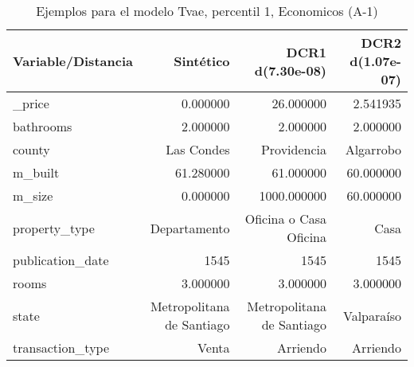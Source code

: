 \begin{table}[H]
\centering
\fontsize{10}{14}\selectfont
\caption{Ejemplos para el modelo Tvae, percentil 1, Economicos (A-1)}
\label{table-example-economicos-a-1-tvae-1p}
\begin{tabular}{|l|r|r|r|}
\hline
\rowcolor[gray]{0.8}
Variable/Distancia & Sintético & DCR1 d(7.30e-08) & DCR2 d(1.07e-07) \\
\hline \_price & \cellcolor[rgb]{0.9, 0.54, 0.52} 0.000000 & 26.000000 & 2.541935 \\
\hline bathrooms & \cellcolor[rgb]{0.9, 0.54, 0.52} 2.000000 & \cellcolor[rgb]{0.9, 0.54, 0.52} 2.000000 & \cellcolor[rgb]{0.9, 0.54, 0.52} 2.000000 \\
\hline county & \cellcolor[rgb]{0.9, 0.54, 0.52} Las Condes & Providencia & Algarrobo \\
\hline m\_built & \cellcolor[rgb]{0.9, 0.54, 0.52} 61.280000 & 61.000000 & 60.000000 \\
\hline m\_size & \cellcolor[rgb]{0.9, 0.54, 0.52} 0.000000 & 1000.000000 & 60.000000 \\
\hline property\_type & \cellcolor[rgb]{0.9, 0.54, 0.52} Departamento & Oficina o Casa Oficina & Casa \\
\hline publication\_date & \cellcolor[rgb]{0.9, 0.54, 0.52} 1545 & \cellcolor[rgb]{0.9, 0.54, 0.52} 1545 & \cellcolor[rgb]{0.9, 0.54, 0.52} 1545 \\
\hline rooms & \cellcolor[rgb]{0.9, 0.54, 0.52} 3.000000 & \cellcolor[rgb]{0.9, 0.54, 0.52} 3.000000 & \cellcolor[rgb]{0.9, 0.54, 0.52} 3.000000 \\
\hline state & \cellcolor[rgb]{0.9, 0.54, 0.52} Metropolitana de Santiago & \cellcolor[rgb]{0.9, 0.54, 0.52} Metropolitana de Santiago & Valparaíso \\
\hline transaction\_type & \cellcolor[rgb]{0.9, 0.54, 0.52} Venta & Arriendo & Arriendo \\
\hline
\end{tabular}
\end{table}
